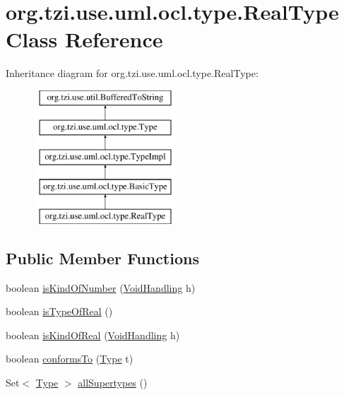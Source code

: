 \hypertarget{classorg_1_1tzi_1_1use_1_1uml_1_1ocl_1_1type_1_1_real_type}{\section{org.\-tzi.\-use.\-uml.\-ocl.\-type.\-Real\-Type Class Reference}
\label{classorg_1_1tzi_1_1use_1_1uml_1_1ocl_1_1type_1_1_real_type}
}
Inheritance diagram for org.\-tzi.\-use.\-uml.\-ocl.\-type.\-Real\-Type\-:\begin{figure}[H]
\begin{center}
\leavevmode
\includegraphics[height=5.000000cm]{classorg_1_1tzi_1_1use_1_1uml_1_1ocl_1_1type_1_1_real_type}
\end{center}
\end{figure}
\subsection*{Public Member Functions}
\begin{DoxyCompactItemize}
\item 
boolean \hyperlink{classorg_1_1tzi_1_1use_1_1uml_1_1ocl_1_1type_1_1_real_type_a280d65bc4575198588a7ed051587a9ae}{is\-Kind\-Of\-Number} (\hyperlink{enumorg_1_1tzi_1_1use_1_1uml_1_1ocl_1_1type_1_1_type_1_1_void_handling}{Void\-Handling} h)
\item 
boolean \hyperlink{classorg_1_1tzi_1_1use_1_1uml_1_1ocl_1_1type_1_1_real_type_af77b3ab45dc165b905bfff3a7880983c}{is\-Type\-Of\-Real} ()
\item 
boolean \hyperlink{classorg_1_1tzi_1_1use_1_1uml_1_1ocl_1_1type_1_1_real_type_a5063e956e12af5d58494260516790ee6}{is\-Kind\-Of\-Real} (\hyperlink{enumorg_1_1tzi_1_1use_1_1uml_1_1ocl_1_1type_1_1_type_1_1_void_handling}{Void\-Handling} h)
\item 
boolean \hyperlink{classorg_1_1tzi_1_1use_1_1uml_1_1ocl_1_1type_1_1_real_type_aebc4382335610b47985316c709af7e0e}{conforms\-To} (\hyperlink{interfaceorg_1_1tzi_1_1use_1_1uml_1_1ocl_1_1type_1_1_type}{Type} t)
\item 
Set$<$ \hyperlink{interfaceorg_1_1tzi_1_1use_1_1uml_1_1ocl_1_1type_1_1_type}{Type} $>$ \hyperlink{classorg_1_1tzi_1_1use_1_1uml_1_1ocl_1_1type_1_1_real_type_a243fca3c61085e000383eeb57d06ca6e}{all\-Supertypes} ()
\end{DoxyCompactItemize}
